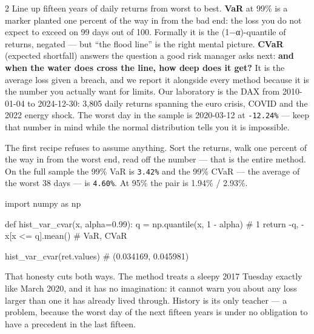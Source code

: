 \documentclass{pyportfolios-note}
\begin{document}
\begin{multicols}{2}
Line up fifteen years of daily returns from worst to best. \textbf{VaR} at 99\%
is a marker planted one percent of the way in from the bad end: the loss you do
not expect to exceed on 99 days out of 100. Formally it is the (1−α)-quantile of
returns, negated — but ``the flood line'' is the right mental picture.
\textbf{CVaR} (expected shortfall) answers the question a good risk manager asks
next: \textbf{and when the water does cross the line, how deep does it get?} It
is the average loss given a breach, and we report it alongside every method
because it is the number you actually want for limits. Our laboratory is the DAX
from 2010-01-04 to 2024-12-30: 3,805 daily returns spanning the euro crisis,
COVID and the 2022 energy shock. The worst day in the sample is 2020-03-12 at
\texttt{-12.24\%} — keep that number in mind while the normal distribution tells
you it is impossible.
\end{multicols}


\noteneedroom{170bp}

The first recipe refuses to assume anything. Sort the returns, walk one percent
of the way in from the worst end, read off the number — that is the entire
method. On the full sample the 99\% VaR is \texttt{3.42\%} and the 99\% CVaR —
the average of the worst 38 days — is \texttt{4.60\%}. At 95\% the pair is
1.94\% / 2.93\%.

\begin{notecode}
import numpy as np

def hist_var_cvar(x, alpha=0.99):
    q = np.quantile(x, 1 - alpha)       # 1%
    return -q, -x[x <= q].mean()        # VaR, CVaR

hist_var_cvar(ret.values)               # (0.034169, 0.045981)
\end{notecode}

That honesty cuts both ways. The method treats a sleepy 2017 Tuesday exactly
like March 2020, and it has no imagination: it cannot warn you about any loss
larger than one it has already lived through. History is its only teacher — a
problem, because the worst day of the next fifteen years is under no obligation
to have a precedent in the last fifteen.
\end{document}
